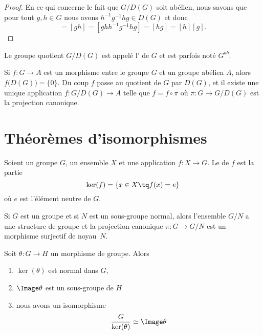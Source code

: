 \begin{proof}
	En ce qui concerne le fait que \( G/D(G)\) soit abélien, nous savons que pour tout \( g,h\in G\) nous avons \( h^{-1}g^{-1}hg\in D(G)\) et donc
	\begin{equation}
		[g][h]=[gh]=[ghh^{-1}g^{-1}hg]=[hg]=[h][g].
	\end{equation}
\end{proof}

Le groupe quotient \( G/D(G)\) est appelé l' de \( G\) et est parfois noté \( G^{ab}\).

Si \( f\colon G\to A\) est un morphisme entre le groupe \( G\) et un groupe abélien \( A\), alors \( f\big( D(G) \big)=\{ 0 \}\). Du coup \( f\) passe au quotient de \( G\) par \( D(G)\), et il existe une unique application \( \bar f\colon G/D(G)\to A\) telle que \( f=\bar f\circ \pi\) où \( \pi\colon G\to G/D(G)\) est la projection canonique.

\section{Théorèmes d'isomorphismes}

\begin{definition}      \label{DEFooWBIYooGNRYOp}
	Soient un groupe \( G\), un ensemble $X$ et une application \( f\colon X\to G\). Le  de \( f\) est la partie
	\begin{equation}
		\ker(f)=\{ x\in X\tq f(x)=e \}
	\end{equation}
	où \( e\) est l'élément neutre de \( G\).
\end{definition}

Si \( G\) est un groupe et si \( N\) est un sous-groupe normal, alors l'ensemble \( G/N\) a une structure de groupe et la projection canonique \( \pi\colon G\to G/N\) est un morphisme surjectif de noyau~\( N\).

\begin{theorem}        \label{ThoPremierthoisomo}
	Soit \( \theta\colon G\to H\) un morphisme de groupe. Alors
	\begin{enumerate}
		\item
		      \( \ker(\theta)\) est normal dans \( G\),
		\item
		      \( \Image \theta\) est un sous-groupe de \( H\)
		\item   \label{ItemWLCLdk}
		      nous avons un isomorphisme
		      \begin{equation}
                  \frac{ G }{ \ker(\theta) }   \simeq \Image\theta
		      \end{equation}
	\end{enumerate}
\end{theorem}

